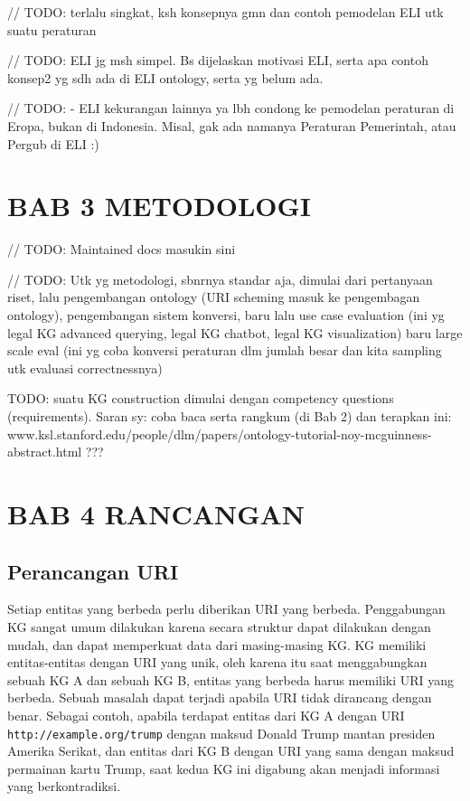 // TODO: terlalu singkat, ksh konsepnya gmn dan contoh pemodelan ELI utk
suatu peraturan

// TODO: ELI jg msh simpel. Bs dijelaskan motivasi ELI, serta apa contoh
konsep2 yg sdh ada di ELI ontology, serta yg belum ada.

// TODO: - ELI kekurangan lainnya ya lbh condong ke pemodelan peraturan
di Eropa, bukan di Indonesia. Misal, gak ada namanya Peraturan
Pemerintah, atau Pergub di ELI :)

\section{BAB 3 METODOLOGI}\label{bab-3-metodologi}

// TODO: Maintained docs masukin sini

// TODO: Utk yg metodologi, sbnrnya standar aja, dimulai dari pertanyaan
riset, lalu pengembangan ontology (URI scheming masuk ke pengembagan
ontology), pengembangan sistem konversi, baru lalu use case evaluation
(ini yg legal KG advanced querying, legal KG chatbot, legal KG
visualization) baru large scale eval (ini yg coba konversi peraturan dlm
jumlah besar dan kita sampling utk evaluasi correctnessnya)

TODO: suatu KG construction dimulai dengan competency questions
(requirements). Saran sy: coba baca serta rangkum (di Bab 2) dan
terapkan ini:
www.ksl.stanford.edu/people/dlm/papers/ontology-tutorial-noy-mcguinness-abstract.html
???

\section{BAB 4 RANCANGAN}\label{bab-4-rancangan}

\subsection{Perancangan URI}\label{perancangan-uri}

Setiap entitas yang berbeda perlu diberikan URI yang berbeda.
Penggabungan KG sangat umum dilakukan karena secara struktur dapat
dilakukan dengan mudah, dan dapat memperkuat data dari masing-masing KG.
KG memiliki entitas-entitas dengan URI yang unik, oleh karena itu saat
menggabungkan sebuah KG A dan sebuah KG B, entitas yang berbeda harus
memiliki URI yang berbeda. Sebuah masalah dapat terjadi apabila URI
tidak dirancang dengan benar. Sebagai contoh, apabila terdapat entitas
dari KG A dengan URI \texttt{http://example.org/trump} dengan maksud
Donald Trump mantan presiden Amerika Serikat, dan entitas dari KG B
dengan URI yang sama dengan maksud permainan kartu Trump, saat kedua KG
ini digabung akan menjadi informasi yang berkontradiksi.

